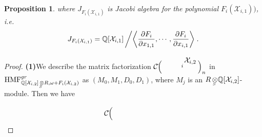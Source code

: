 \documentclass[10pt]{amsart}
\theoremstyle{break}
\newtheorem{pro}[de]{Proposition}
\begin{document}
\begin{pro}
where $J_{F_{i}(\mathcal{X}_{i,1})}$ is Jacobi algebra for the polynomial $F_{i}(\mathcal{X}_{i,1}))$, i.e.
$$
J_{F_{i}(\mathcal{X}_{i,1})}={{\mathbb{Q}}} [\mathcal{X}_{i,1}] \left/ 
\left< \frac{\partial F_{i}}{\partial x_{1,1}}, \cdots , \frac{\partial F_{i}}{\partial x_{i,1}} \right>\right. .
$$
\end{pro}

\begin{proof}

{\bf (1)}We describe the matrix factorization ${{\mathcal{C}}}\acute{}\Big( \ 
\unitlength 0.1in
\begin{picture}(6.0,2.500)(2.00,-4.500)
\special{pn 8}\special{pa 370 300}\special{pa 330 250}\special{fp}\special{pa 275 355}\special{pa 200 280}\special{fp}\special{pa 280 450}\special{pa 200 490}\special{fp}\special{pa 370 500}\special{pa 340 550}\special{fp}\put(7.0000,-3.0000){\makebox(0,0){$\mathcal{X}_{{i,2}}$}}\put(5.5000,-3.9000){\makebox(0,0){${}_{i}$}}\special{pn 8}\special{ar 370 400 100 100  0.0000000 0.1200000}\special{ar 370 400 100 100  0.4800000 0.6000000}\special{ar 370 400 100 100  0.9600000 1.0800000}\special{ar 370 400 100 100  1.4400000 1.5600000}\special{ar 370 400 100 100  1.9200000 2.0400000}\special{ar 370 400 100 100  2.4000000 2.5200000}\special{ar 370 400 100 100  2.8800000 3.0000000}\special{ar 370 400 100 100  3.3600000 3.4800000}\special{ar 370 400 100 100  3.8400000 3.9600000}\special{ar 370 400 100 100  4.3200000 4.4400000}\special{ar 370 400 100 100  4.8000000 4.9200000}\special{ar 370 400 100 100  5.2800000 5.4000000}\special{ar 370 400 100 100  5.7600000 5.8800000}\special{ar 370 400 100 100  6.2400000 6.2832853}\special{pn 8}\special{pa 470 390}\special{pa 495 366}\special{pa 519 337}\special{pa 543 316}\special{pa 566 310}\special{sp}\special{sh 1}\special{pa 566 310}\special{pa 499 330}\special{pa 520 340}\special{pa 520 360}\special{pa 566 310}\special{fp}\end{picture}
 \ \Big)_{n}$ in $ {{\mathrm{HMF}}}^{gr}_{{{\mathbb{Q}}} [\mathcal{X}_{i,2}]{{\,\otimes\hspace{-0.7em}\raisebox{-0.5ex}{${}_{{}_{S}}$}\,}} R,\omega +F_i(\mathcal{X}_{i,2})}$ as $\left( M_0,M_1,D_0,D_1 \right) $,
where $M_j$ is an $R {{\,\otimes\hspace{-0.7em}\raisebox{-0.5ex}{${}_{{}_{S}}$}\,}} {{\mathbb{Q}}} [\mathcal{X}_{i,2}]$-module. Then we have
$$
{{\mathcal{C}}}\acute{}\Big( \ 
\unitlength 0.1in
\begin{picture}(9.0,2.500)(2.00,-4.500)

\end{picture}$$
\end{proof}
\end{document}
